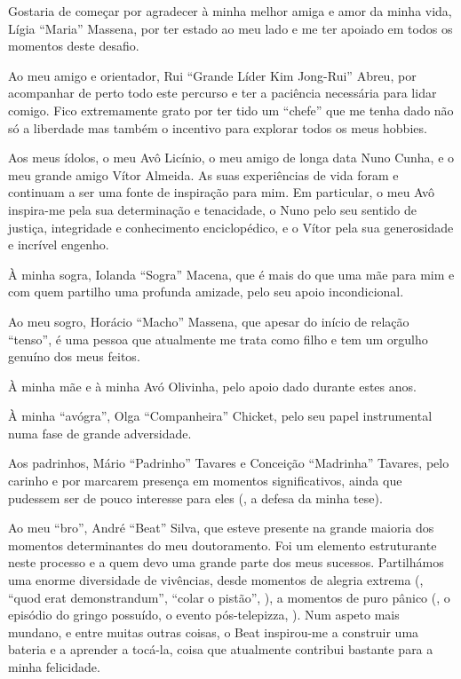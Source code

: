Gostaria de começar por agradecer à minha melhor amiga e amor da minha
vida, Lígia ``Maria'' Massena, por ter estado ao meu lado e me ter
apoiado em todos os momentos deste desafio.
%



Ao meu amigo e orientador, Rui ``Grande Líder Kim Jong-Rui'' Abreu,
por acompanhar de perto todo este percurso e ter a paciência
necessária para lidar comigo.
%
Fico extremamente grato por ter tido um ``chefe'' que me tenha dado
não só a liberdade mas também o incentivo para explorar todos os meus
hobbies.



Aos meus ídolos, o meu Avô Licínio, o meu amigo de longa data Nuno
Cunha, e o meu grande amigo Vítor Almeida.
%
As suas experiências de vida foram e continuam a ser uma fonte de
inspiração para mim.
%
Em particular, o meu Avô inspira-me pela sua determinação e
tenacidade, o Nuno pelo seu sentido de justiça, integridade e
conhecimento enciclopédico, e o Vítor pela sua generosidade e incrível
engenho.

À minha sogra, Iolanda ``Sogra'' Macena, que é mais do que uma mãe
para mim e com quem partilho uma profunda amizade, pelo seu apoio
incondicional.

Ao meu sogro, Horácio ``Macho'' Massena, que apesar do início de
relação ``tenso'', é uma pessoa que atualmente me trata como filho e
tem um orgulho genuíno dos meus feitos.

À minha mãe e à minha Avó Olivinha, pelo apoio dado durante estes anos.

À minha ``avógra'', Olga ``Companheira'' Chicket, pelo seu papel
instrumental numa fase de grande adversidade.

Aos padrinhos, Mário ``Padrinho'' Tavares e Conceição ``Madrinha''
Tavares, pelo carinho e por marcarem presença em momentos
significativos, ainda que pudessem ser de pouco interesse para eles
(\eg, a defesa da minha tese).


Ao meu ``bro'', André ``Beat'' Silva, que esteve presente na grande
maioria dos momentos determinantes do meu doutoramento.
%
Foi um elemento estruturante neste processo e a quem devo uma grande
parte dos meus sucessos.
%
Partilhámos uma enorme diversidade de vivências, desde momentos de
alegria extrema (\eg, ``quod erat demonstrandum'', ``colar o pistão'',
\etc), a momentos de puro pânico (\eg, o episódio do gringo possuído,
o evento pós-telepizza, \etc).
%
Num aspeto mais mundano, e entre muitas outras coisas, o Beat
inspirou-me a construir uma bateria e a aprender a tocá-la, coisa
que atualmente contribui bastante para a minha felicidade.

